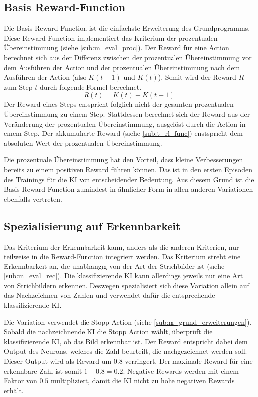 \subsection{Basis Reward-Function}\label{sub:m_var_base} Die Basis
Reward-Function ist die einfachste Erweiterung des Grundprogramms. Diese
Reward-Function implementiert das Kriterium der prozentualen Übereinstimmung
(siehe \ref{sub:m_eval_proc}). Der Reward für eine Action berechnet sich
aus der Differenz zwischen der prozentualen Übereinstimmung vor dem Ausführen
der Action und der prozentualen Übereinstimmung nach dem Ausführen der Action
(also $K(t-1)$ und $K(t)$). Somit wird der Reward $R$ zum Step $t$ durch
folgende Formel berechnet.
\[ R(t) = K(t) - K(t-1) \] Der Reward eines Steps entspricht folglich nicht der
gesamten prozentualen Übereinstimmung zu einem Step. Stattdessen berechnet sich der
Reward aus der Veränderung der prozentualen Übereinstimmung, ausgelöst durch die
Action in einem Step. Der akkumulierte Reward (siehe \ref{sub:t_rl_func})
enstspricht dem absoluten Wert der prozentualen Übereinstimmung. 

Die prozentuale Übereinstimmung hat den Vorteil, dass kleine Verbesserungen
bereits zu einem positiven Reward führen können. Das ist in den ersten Episoden
des Trainings für die KI von entscheidender Bedeutung. Aus diesem Grund ist die
Basis Reward-Function zumindest in ähnlicher Form in allen anderen Variationen
ebenfalls vertreten.

\subsection{Spezialisierung auf Erkennbarkeit}\label{sub:m_var_rec} Das
Kriterium der Erkennbarkeit kann, anders als die anderen Kriterien, nur
teilweise in die Reward-Function integriert werden. Das Kriterium strebt eine
Erkennbarkeit an, die unabhängig von der Art der Strichbilder ist (siehe
\ref{sub:m_eval_rec}). Die klassifizierende KI kann allerdings jeweils nur
eine Art von Strichbildern erkennen. Deswegen spezialisiert sich diese Variation
allein auf das Nachzeichnen von Zahlen und verwendet dafür die entsprechende
klassifizierende KI.

Die Variation verwendet die Stopp Action (siehe
\ref{sub:m_grund_erweiterungen}). Sobald die nachzeichnende KI die Stopp
Action wählt, überprüft die klassifizierende KI, ob das Bild erkennbar ist. Der
Reward entspricht dabei dem Output des Neurons, welches die Zahl beurteilt, die
nachgezeichnet werden soll. Dieser Output wird als Reward um $0.8$ verringert.
Der maximale Reward für eine erkennbare Zahl ist somit $1 - 0.8 = 0.2$. Negative
Rewards werden mit einem Faktor von $0.5$ multipliziert, damit die KI nicht zu
hohe negativen Rewards erhält.

